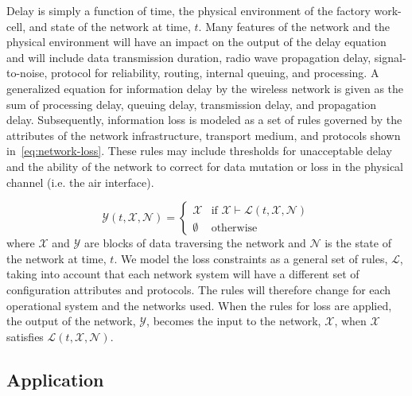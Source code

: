 \documentclass[journal, twoside]{IEEEtran}
\begin{document}
	Delay is simply a function of time, the physical environment of the factory work-cell, and state of the network at time, $t$. Many features of the network and the physical environment will have an impact on the output of the delay equation and will include data transmission duration, radio wave propagation delay, signal-to-noise, protocol for reliability, routing, internal queuing, and processing. A generalized equation for information delay by the wireless network is given as the sum of processing delay, queuing delay, transmission delay, and propagation delay. Subsequently, information loss is modeled as a set of rules governed by the attributes of the network infrastructure, transport medium, and protocols shown in~\eqref{eq:network-loss}. These rules may include thresholds for unacceptable delay and the ability of the network to correct for data mutation or loss in the physical channel (i.e. the air interface).
	
	\begin{equation}\label{eq:network-loss}
	\mathcal{Y}(t,\mathcal{X},\mathcal{N}) = 
	\begin{cases} 
	\mathcal{X} & \text{if } \mathcal{X} \vdash \mathcal{L}(t,\mathcal{X},\mathcal{N}) \\
	\emptyset   & \text{otherwise}
	\end{cases}
	\end{equation}
    where $\mathcal{X}$ and $\mathcal{Y}$ are blocks of data traversing the network and $\mathcal{N}$ is the state of the network at time, $t$.	We model the loss constraints as a general set of rules, $\mathcal{L}$, taking into account that each network system will have a different set of configuration attributes and protocols.  The rules will therefore change for each operational system and the networks used.  When the rules for loss are applied, the output of the network, $\mathcal{Y}$, becomes the input to the network, $\mathcal{X}$, when $\mathcal{X}$ satisfies $\mathcal{L}(t,\mathcal{X},\mathcal{N})$.
	
	\subsection{Application}\label{sec:application}
	
\end{document}
